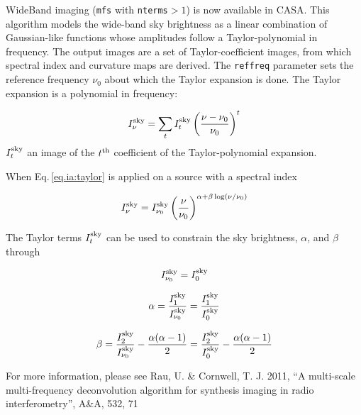 WideBand imaging ({\tt mfs} with {\tt nterms}$>1$) is now available in
CASA. This algorithm models the wide-band sky brightness as a linear
combination of Gaussian-like functions whose amplitudes follow a
Taylor-polynomial in frequency.  The output images are a set of
Taylor-coefficient images, from which spectral index and curvature
maps are derived. The {\tt reffreq} parameter sets the reference
frequency $\nu_0$ about which the Taylor expansion is done. The Taylor
expansion is a polynomial in frequency:

\begin{equation}
I_{\nu}^{\rm sky}=\sum_{t} I_{t}^{\rm sky} \left(\frac{\nu-\nu_0}{\nu_0}\right)^t
\label{eq.ia:taylor}
\end{equation}
$I_{t}^{\rm sky}$ an image of the $t^{\rm th}$
coefficient of the Taylor-polynomial expansion.

When Eq.\,\ref{eq.ia:taylor} is applied on a source with a spectral index

\begin{equation}
I_{\nu}^{\rm sky}=I_{\nu_0}^{\rm sky} \left(\frac{\nu}{\nu_0}\right)^{\alpha + \beta \log(\nu/\nu_0)}
\label{eq.ia:specindex}
\end{equation}

The Taylor terms $I_{t}^{\rm sky}$ can be used to constrain the sky
brightness, $\alpha$, and $\beta$ through

\begin{equation}
I_{\nu_0}^{\rm sky}=I_{0}^{\rm sky}
\label{eq.ia:taylorsky}
\end{equation}

\begin{equation}
\alpha= \frac{I_1^{\rm sky}}{I_{\nu_0}^{\rm sky}}=\frac{I_1^{\rm sky}}{I_{0}^{\rm sky}} \\
\label{eq.ia:tayloralpha}
\end{equation}

\begin{equation}
\beta=\frac{I_2^{\rm sky}}{I_{\nu_0}^{\rm sky}}-\frac{\alpha(\alpha-1)}{2}=\frac{I_2^{\rm sky}}{I_{0}^{\rm sky}}-\frac{\alpha(\alpha-1)}{2}
\label{eq.ia:taylorbeta}
\end{equation}



For more information, please see Rau, U. \& Cornwell, T. J. 2011, ``A
multi-scale multi-frequency deconvolution algorithm for synthesis
imaging in radio interferometry'', A\&A, 532, 71 %

